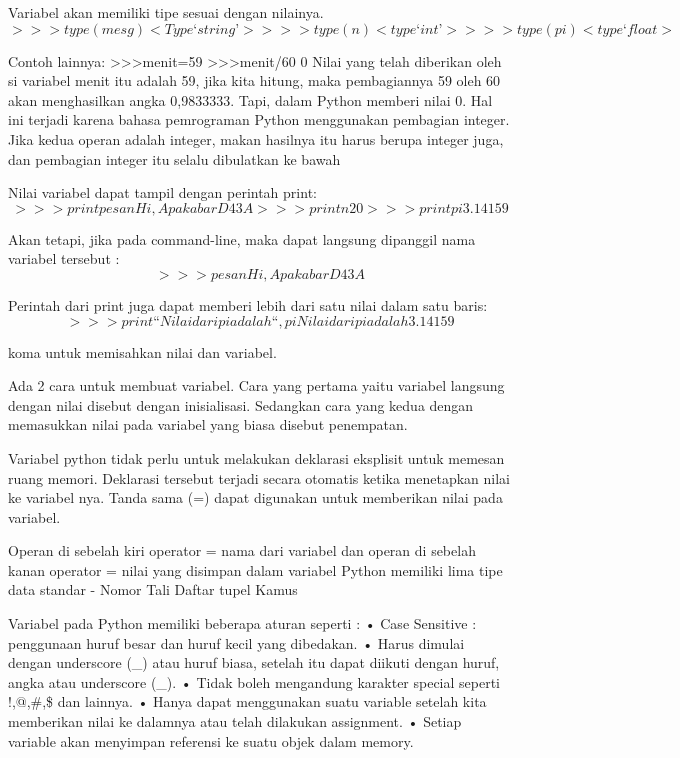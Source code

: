 Variabel akan memiliki tipe  sesuai dengan nilainya.
\begin{equation}
>>>type(mesg)
<Type ‘string’>
>>> type (n)
<type ‘int’>
>>> type (pi)
<type ‘float>
\end{equation}

Contoh lainnya:
>>>menit=59
>>>menit/60
0
Nilai yang telah diberikan oleh si variabel menit itu adalah 59, jika kita hitung, maka pembagiannya 59 oleh 60 akan menghasilkan angka 0,9833333. Tapi, dalam Python memberi nilai 0. Hal ini terjadi karena bahasa pemrograman Python menggunakan pembagian integer. Jika kedua operan adalah integer, makan hasilnya itu harus berupa integer juga, dan pembagian integer itu selalu dibulatkan ke bawah

Nilai variabel dapat tampil dengan perintah print:
\begin{equation}
>>> print pesan
Hi, Apa kabar D43A
>>> print n
20
>>>print pi
3.14159
\end{equation}

Akan tetapi, jika pada command-line, maka dapat langsung dipanggil nama variabel tersebut :
\begin{equation}
>>> pesan
Hi, Apa kabar D43A
\end{equation}

Perintah dari print juga dapat memberi lebih dari satu nilai dalam satu baris:
\begin{equation}
>>> print “Nilai dari pi adalah “,pi
Nilai dari pi adalah 3.14159
\end{equation}

koma untuk memisahkan nilai dan variabel.\cite{utami2004logika}

Ada 2 cara untuk membuat variabel. Cara yang pertama yaitu variabel langsung dengan nilai disebut dengan inisialisasi. Sedangkan cara yang kedua dengan memasukkan nilai pada variabel yang biasa disebut penempatan.\cite{santoso2009bahasa}

Variabel python tidak perlu untuk melakukan deklarasi eksplisit untuk memesan ruang memori. Deklarasi tersebut terjadi secara otomatis ketika menetapkan nilai ke variabel nya.
Tanda sama (=) dapat digunakan untuk memberikan nilai pada variabel.

Operan di sebelah kiri operator =  nama dari variabel dan operan di sebelah kanan operator = nilai yang disimpan dalam variabel
Python memiliki lima tipe data standar -
Nomor
Tali
Daftar
tupel
Kamus

Variabel pada Python memiliki beberapa aturan seperti :
•    Case Sensitive : penggunaan huruf besar dan huruf kecil yang dibedakan.
•    Harus dimulai dengan underscore (_) atau huruf biasa, setelah itu dapat diikuti dengan huruf, angka atau underscore (_).
•    Tidak boleh mengandung karakter special seperti !,@,\#,\$ dan lainnya.
•    Hanya dapat menggunakan suatu variable setelah kita memberikan nilai ke dalamnya atau telah dilakukan assignment.
•    Setiap variable akan menyimpan referensi ke suatu objek dalam memory.\cite{santoso2009bahasa}

